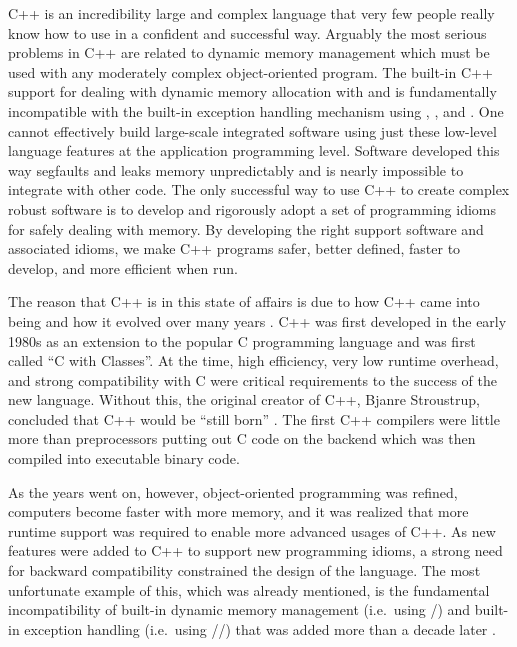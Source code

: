 \documentclass[pdf,ps2pdf,11pt]{SANDreport}
\begin{document}
C++ is an incredibility large and complex language that very few
people really know how to use in a confident and successful way.
Arguably the most serious problems in C++ are related to dynamic
memory management which must be used with any moderately complex
object-oriented program.  The built-in C++ support for dealing with
dynamic memory allocation with {} and {} is
fundamentally incompatible with the built-in exception handling
mechanism using {}, {}, and
{}.  One cannot effectively build large-scale integrated
software using just these low-level language features at the
application programming level.  Software developed this way segfaults
and leaks memory unpredictably and is nearly impossible to integrate
with other code.  The only successful way to use C++ to create complex
robust software is to develop and rigorously adopt a set of
programming idioms for safely dealing with memory.  By developing the
right support software and associated idioms, we make C++ programs
safer, better defined, faster to develop, and more efficient when run.

The reason that C++ is in this state of affairs is due to how C++ came
into being and how it evolved over many years {}\cite{stroustrup94,
stroustrup07}.  C++ was first developed in the early 1980s as an
extension to the popular C programming language and was first called
``C with Classes''.  At the time, high efficiency, very low runtime
overhead, and strong compatibility with C were critical requirements
to the success of the new language.  Without this, the original
creator of C++, Bjanre Stroustrup, concluded that C++ would be ``still
born'' {}\cite{stroustrup97}.  The first C++ compilers were little
more than preprocessors putting out C code on the backend which was
then compiled into executable binary code.

As the years went on, however, object-oriented programming was
refined, computers become faster with more memory, and it was realized
that more runtime support was required to enable more advanced usages
of C++.  As new features were added to C++ to support new programming
idioms, a strong need for backward compatibility constrained the
design of the language.  The most unfortunate example of this, which
was already mentioned, is the fundamental incompatibility of built-in
dynamic memory management (i.e.\ using
{}/{}) and built-in exception handling
(i.e.\ using {}/{}/{}) that
was added more than a decade later {}\cite{stroustrup94}.
\end{document}
